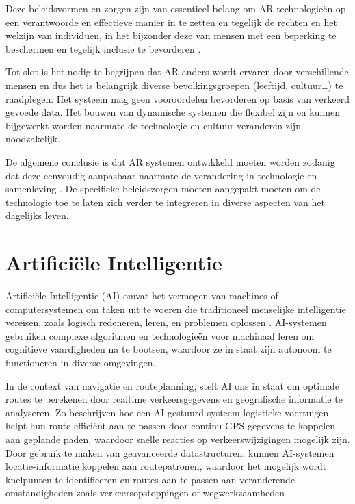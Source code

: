 Deze beleidsvormen en zorgen zijn van essentieel belang om AR technologieën op een verantwoorde en effectieve manier in te zetten en tegelijk de rechten en het welzijn van individuen, in het bijzonder deze van mensen met een beperking te beschermen en tegelijk inclusie te bevorderen \autocite{Roesner2014}.

Tot slot is het nodig te begrijpen dat AR anders wordt ervaren door verschillende mensen en dus het is belangrijk diverse bevolkingsgroepen (leeftijd, cultuur\ldots) te raadplegen. Het systeem mag geen vooroordelen bevorderen op basis van verkeerd gevoede data. Het bouwen van dynamische systemen die flexibel zijn en kunnen bijgewerkt worden naarmate de technologie en cultuur veranderen zijn noodzakelijk. 

De algemene conclusie is dat AR systemen ontwikkeld moeten worden zodanig dat deze eenvoudig aanpasbaar naarmate de verandering in technologie en samenleving \autocite{Calo2015}.  De specifieke beleidszorgen moeten aangepakt moeten om de technologie toe te laten zich verder te integreren in diverse aspecten van het dagelijks leven.

\section{Artificiële Intelligentie}
\label{sec:artificiele-intelligentie}

Artificiële Intelligentie (AI) omvat het vermogen van machines of computersystemen om taken uit te voeren die traditioneel menselijke intelligentie vereisen, zoals logisch redeneren, leren, en problemen oplossen \autocite{Sabouret2020}. AI-systemen gebruiken complexe algoritmen en technologieën voor machinaal leren om cognitieve vaardigheden na te bootsen, waardoor ze in staat zijn autonoom te functioneren in diverse omgevingen. 

In de context van navigatie en routeplanning, stelt AI ons in staat om optimale routes te berekenen door realtime verkeersgegevens en geografische informatie te analyseren. Zo beschrijven \textcite{Hu2020} hoe een AI-gestuurd systeem logistieke voertuigen helpt hun route efficiënt aan te passen door continu GPS-gegevens te koppelen aan geplande paden, waardoor snelle reacties op verkeerswijzigingen mogelijk zijn. Door gebruik te maken van geavanceerde datastructuren, kunnen AI-systemen locatie-informatie koppelen aan routepatronen, waardoor het mogelijk wordt knelpunten te identificeren en routes aan te passen aan veranderende omstandigheden zoals verkeersopstoppingen of wegwerkzaamheden \autocite{Soni2023a,Ruta2010}. 

